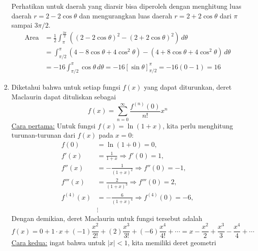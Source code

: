 \documentclass[11pt,openany,a4paper]{article}
\begin{document}
\begin{enumerate}
\begin{center}
    \end{center}
    Perhatikan untuk daerah yang diarsir bisa diperoleh dengan menghitung luas daerah $r=2-2\cos\theta$ dan mengurangkan luas daerah $r=2+2\cos\theta$ dari $\pi$ sampai $3\pi/2$.
    \begin{align*}
        \text{Area} &= \frac{1}{2} \int_{\pi}^{\frac{3\pi}{2}} \left( (2 - 2\cos\theta)^2 - (2 + 2\cos\theta)^2 \right) \, d\theta \\
        &= \int_{\pi/2}^{\pi} \left( 4 - 8\cos\theta + 4\cos^2\theta \right) - \left( 4 + 8\cos\theta + 4\cos^2\theta \right) \, d\theta \\
        &= -16\int_{\pi/2}^{\pi} \cos\theta \, d\theta = -16 \left[ \sin\theta \right]_{\pi/2}^{\pi} = -16 \left( 0 - 1 \right) = 16 
    \end{align*}
      \item Diketahui bahwa untuk setiap fungsi \( f(x) \) yang dapat diturunkan, deret Maclaurin dapat dituliskan sebagai
        \[
            f(x) = \sum_{n=0}^{\infty} \frac{f^{(n)}(0)}{n!} x^n
        \]
        \underline{Cara pertama:} Untuk fungsi \( f(x) = \ln(1+x) \), kita perlu menghitung turunan-turunan dari \( f(x) \) pada \( x = 0 \):
        \begin{align*}
            f(0) &= \ln(1+0) = 0,\\
            f'(x) &= \frac{1}{1+x} \Rightarrow f'(0) = 1,\\
            f''(x) &= -\frac{1}{(1+x)^2} \Rightarrow f''(0) = -1,\\
            f'''(x) &= \frac{2}{(1+x)^3} \Rightarrow f'''(0) = 2,\\
            f^{(4)}(x) &= -\frac{6}{(1+x)^4} \Rightarrow f^{(4)}(0) = -6,\\
            &\vdots
        \end{align*}
        Dengan demikian, deret Maclaurin untuk fungsi tersebut adalah
        \[
            f(x) = 0  + 1\cdot x + (-1)\frac{x^2}{2!} + (2)\frac{x^3}{3!} + (-6)\frac{x^4}{4!} + \cdots = \boxed{x - \frac{x^2}{2} + \frac{x^3}{3} - \frac{x^4}{4} + \cdots}
        \]
        \underline{Cara kedua:} ingat bahwa untuk \( |x| < 1 \), kita memiliki deret geometri 

\end{enumerate}
\end{document}
